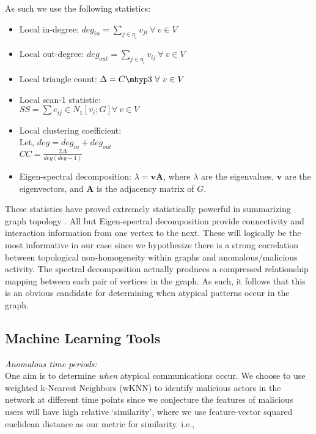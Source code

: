 \documentclass[11pt,letterpaper]{article}
\begin{document}
 
As such we use the following statistics:
\begin{itemize}
\item Local in-degree: $deg_{in} = \sum_{j \in \eta_i} v_{ji}\  \forall\ v \in V$
\item Local out-degree: $deg_{out} = \sum_{j \in \eta_i} v_{ij}\  \forall\ v \in V$ 
\item Local triangle count: $\Delta = C\mhyp3 \  \forall\ v \in V$
\item Local scan-1 statistic: \\ $SS = \sum e_{ij} \in N_1[v_i;G] \forall\ v \in V$
\item Local clustering coefficient: \\ Let, $deg = deg_{in} + deg_{out}$ 
\\ $CC = \frac{2\Delta}{deg (deg-1)}$
\item Eigen-spectral decomposition: $\lambda = \mathbf{vA}$, where $\lambda$ are the
eigenvalues, $\mathbf{v}$ are the eigenvectors, and $\mathbf{A}$ is the adjacency matrix of $G$.

\end{itemize}
These statistics have proved extremely statistically powerful in summarizing graph
topology \cite{pao2011statistical}. All but Eigen-spectral decomposition provide
connectivity and interaction information from one vertex to the next. These will
logically be the most informative in our case since we hypothesize there is a strong
correlation between topological non-homogeneity within graphs and anomalous/malicious
activity. The spectral decomposition actually produces a compressed relationship mapping
between each pair of vertices in the graph. As such, it follows that this is an obvious
candidate for determining when atypical patterns occur in the graph.

\subsection{Machine Learning Tools}
\hspace*{10pt}\textit{Anomalous time periods:} \\
One aim is to determine \textit{when} atypical communications occur. We choose to
use weighted k-Nearest Neighbors (wKNN) to identify malicious actors in the network
at different time points since we conjecture the features of malicious users will
have high relative `similarity', where we use feature-vector squared euclidean distance
as our metric for similarity. i.e.,
\end{document}
